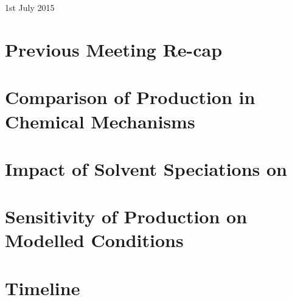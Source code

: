 \documentclass[center]{beamer}
\begin{document}


\begin{frame} %
    \vspace{3cm}
    {\Large \textcolor{\highlightcolor}{\textbf{\slidesettitle}}}\\ 
    \vspace{1cm}
    {\Large \textcolor{GreyIASS}{\textbf{\authorname}}} \\
    \vspace{.5cm}
    {\large \textcolor{GreyIASS}{1st July 2015}} 
\end{frame}



%

\section{Previous Meeting Re-cap}


\section{Comparison of  Production in Chemical Mechanisms}


\section{Impact of Solvent Speciations on }


\section{Sensitivity of  Production on Modelled Conditions}


\section{Timeline}


% 
\end{document}

